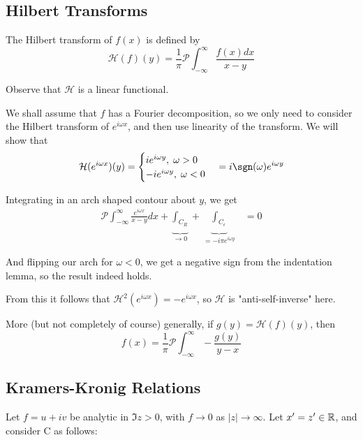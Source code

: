 \documentclass[a4paper]{article}
\begin{document}
\subsection*{Hilbert Transforms}

\begin{defn}
	The Hilbert transform of $f(x)$ is defined by
	\[
		\mathcal{H}(f)(y) = \frac{1}{\pi} \mathcal{P} \int_{-\infty}^{\infty} \frac{f(x) dx}{x-y}
	\] 
\end{defn}

\begin{remark}
	Observe that $\mathcal{H}$ is a linear functional.
\end{remark}

We shall assume that $f$ has a Fourier decomposition, so we only need to consider the Hilbert transform of $e^{i\omega x}$, and then use linearity of the transform. We will show that 
\[
	\mathcal{H}(e^{i\omega x})(y) = \begin{cases}
		ie^{i\omega y}, \; \omega > 0 \\
		-ie^{i\omega y}, \; \omega < 0
	\end{cases} = i \sgn(\omega) e^{i\omega y}
\] 

Integrating in an arch shaped contour about $y$, we get
\begin{align*}
	\mathcal{P} \int_{-\infty}^{\infty} \frac{e^{i\omega x}}{x-y} dx + \underbrace{\int_{C_R}}_{\to 0} + \underbrace{\int_{C_\epsilon}}_{= -i\pi e^{i\omega y}} &= 0
\end{align*}

And flipping our arch for $\omega < 0$, we get a negative sign from the indentation lemma, so the result indeed holds.

\begin{remark}
	From this it follows that $\mathcal{H}^2(e^{i\omega x}) = -e^{i\omega x}$, so $\mathcal{H}$ is "anti-self-inverse" here.

	More (but not completely of course)  generally, if $g(y) = \mathcal{H}(f)(y)$, then
	\[
		f(x) = \frac{1}{\pi} \mathcal{P} \int_{-\infty}^{\infty} -\frac{g(y)}{y-x}
	\] 
\end{remark}

\subsection*{Kramers-Kronig Relations}

Let $f=u+iv$ be analytic in $\Im z >0$, with $f\to 0$ as $|z|\to \infty$. Let $x' = z' \in \mathbb{R}$, and consider C as follows:
\begin{figure}[ht]
    \centering
\end{figure}
\end{document}
